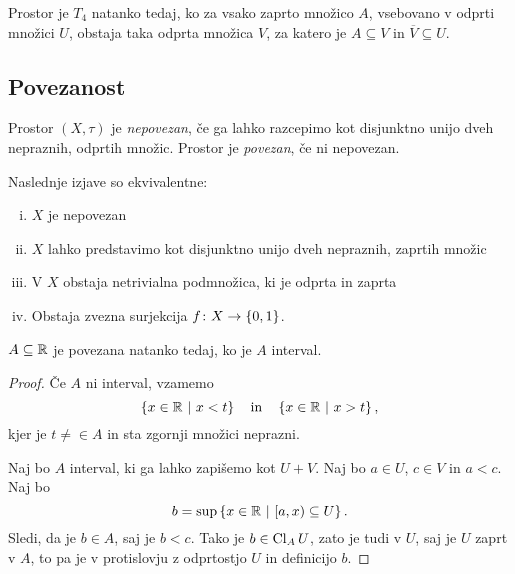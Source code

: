 \begin{trditev}
Prostor je $T_4$ natanko tedaj, ko za vsako zaprto množico $A$,
vsebovano v odprti množici $U$, obstaja taka odprta množica $V$,
za katero je $A \subseteq V$ in $\overline{V} \subseteq U$.
\end{trditev}

\obvs

\newpage

\subsection{Povezanost}


\begin{okvir}
\begin{definicija}
Prostor $(X, \tau)$ je \emph{nepovezan}, če ga lahko razcepimo kot
disjunktno unijo dveh nepraznih, odprtih množic. Prostor je
\emph{povezan}, če ni
nepovezan.
\end{definicija}
\end{okvir}

\begin{trditev}
Naslednje izjave so ekvivalentne:

\begin{enumerate}[i)]
\item $X$ je nepovezan
\item $X$ lahko predstavimo kot disjunktno unijo dveh nepraznih,
zaprtih množic
\item V $X$ obstaja netrivialna podmnožica, ki je odprta in zaprta
\item Obstaja zvezna surjekcija $f \colon X \to \left\{0,1\right\}$.
\end{enumerate}
\end{trditev}

\obvs

\begin{izrek}
$A \subseteq \mathbb{R}$ je povezana natanko tedaj, ko je $A$ interval.
\end{izrek}

\begin{proof}
Če $A$ ni interval, vzamemo
\[
\left\{x \in \mathbb{R}~\middle\vert~x<t\right\} \quad \text{in} \quad \left\{x \in \mathbb{R}~\middle\vert~x>t\right\},
\]
kjer je $t \ne \in A$ in sta zgornji množici neprazni.

Naj bo $A$ interval, ki ga lahko zapišemo kot $U+V$. Naj bo
$a \in U$, $c \in V$ in $a < c$. Naj bo
\[
b = \sup \left\{x \in \mathbb{R}~\middle\vert~[a,x) \subseteq U\right\}.
\]
Sledi, da je $b \in A$, saj je $b < c$. Tako je $b \in \operatorname{Cl}_A U$,
zato je tudi v $U$, saj je $U$ zaprt v $A$, to pa je v protislovju
z odprtostjo $U$ in definicijo $b$.
\end{proof}

